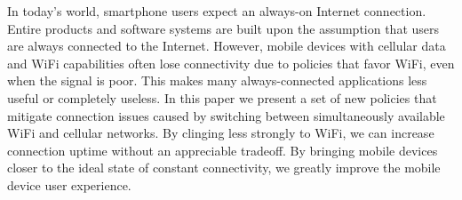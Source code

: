 
In today's world, smartphone users expect an always-on Internet connection. Entire products and software systems are built upon the assumption that users are always connected to the Internet. However, mobile devices with cellular data and WiFi capabilities often lose connectivity due to policies that favor WiFi, even when the signal is poor. This makes many always-connected applications less useful or completely useless. In this paper we present a set of new policies that mitigate connection issues caused by switching between simultaneously available WiFi and cellular networks. By clinging less strongly to WiFi, we can increase connection uptime without an appreciable tradeoff. By bringing mobile devices closer to the ideal state of constant connectivity, we greatly improve the mobile device user experience.